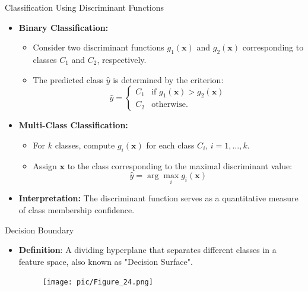 \documentclass[serif, aspectratio=169]{beamer}
\begin{document}
    \begin{frame}{Classification Using Discriminant Functions}
        \begin{itemize}\itemsep1.5em
        \item \textbf{Binary Classification:}\\
        \begin{itemize}
            \item Consider two discriminant functions $g_1(\mathbf{x})$ and $g_2(\mathbf{x})$ corresponding to classes $C_1$ and $C_2$, respectively.
            \item The predicted class $\hat{y}$ is determined by the criterion:
            \[
                \hat{y} =
                \begin{cases}
                    C_1 & \text{if } g_1(\mathbf{x}) > g_2(\mathbf{x}) \\
                    C_2 & \text{otherwise.}
                \end{cases}
            \]
        \end{itemize}

        \item \textbf{Multi-Class Classification:}\\
        \begin{itemize}
            \item For $k$ classes, compute $g_i(\mathbf{x})$ for each class $C_i$, $i=1,\dots,k$.
            \item Assign $\mathbf{x}$ to the class corresponding to the maximal discriminant value:
            \[
                \hat{y} = \arg \max_{i} g_i(\mathbf{x})
            \]
        \end{itemize}

        \item \textbf{Interpretation:}
        The discriminant function serves as a quantitative measure of class membership confidence.
        \end{itemize}
    \end{frame}


    \begin{frame}{Decision Boundary}
        \begin{itemize}
            \item \justifying \textbf{Definition}: A dividing hyperplane that separates different classes in a feature space, also known as "Decision Surface".
            \medskip
            \begin{figure}
                \centering
                \texttt{[image: pic/Figure\_24.png]}
            \end{figure}
        \end{itemize}
    \end{frame}
\end{document}
